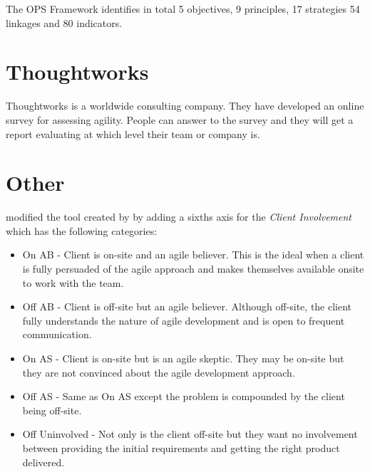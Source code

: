 The OPS Framework identifies in total 5 objectives, 9 principles, 17 strategies 54 linkages and 80 indicators.

\section{Thoughtworks}
Thoughtworks \cite{thoughtworks} is a worldwide consulting company. They have developed an online survey for assessing agility. People can answer to the survey and they will get a report evaluating at which level their team or company is.

\section{Other}
\citet{taylor} modified the tool created by \citet{1231450} by adding a sixths axis for the \textit{Client Involvement} which has the following categories:

\begin{itemize}
\item On AB - Client is on-site and an agile believer. This is the ideal when a client is fully persuaded of the agile approach and makes themselves available onsite to work with the team.
\item Off AB - Client is off-site but an agile believer. Although off-site, the client fully understands the nature of agile development and is open to frequent communication.
\item On AS - Client is on-site but is an agile skeptic. They may be on-site but they are not convinced about the agile development approach.
\item Off AS - Same as On AS except the problem is compounded by the client being off-site.
\item Off Uninvolved - Not only is the client off-site but they want no involvement between providing the initial requirements and getting the right product delivered.
\end{itemize}

